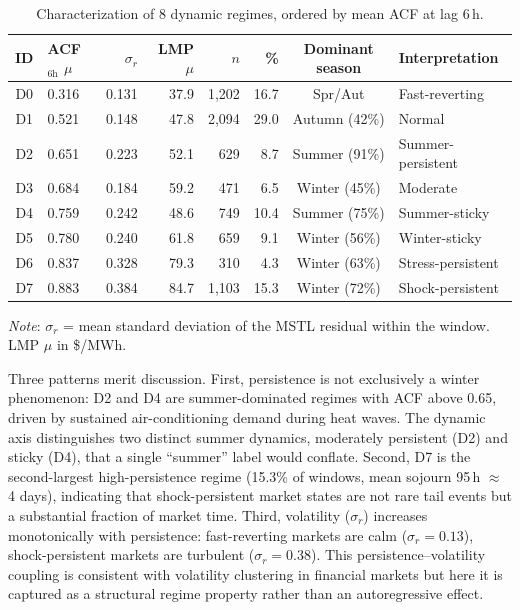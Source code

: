 \documentclass[12pt]{article}
\begin{document}
\begin{table}[H]
\centering
\caption{Characterization of 8 dynamic regimes, ordered by mean ACF at lag 6\,h.}
\label{tab:dynamic_regimes}
\small
\setlength{\tabcolsep}{4pt}
\begin{tabular}{clrrrrcl}
\toprule
ID & ACF$_\text{6h}$ $\mu$ & $\sigma_r$ & LMP $\mu$ & $n$ & \% & Dominant season & Interpretation \\
\midrule
D0 & 0.316 & 0.131 & 37.9 & 1{,}202 & 16.7 & Spr/Aut          & Fast-reverting \\
D1 & 0.521 & 0.148 & 47.8 & 2{,}094 & 29.0 & Autumn (42\%)    & Normal \\
D2 & 0.651 & 0.223 & 52.1 & 629     & 8.7  & Summer (91\%)    & Summer-persistent \\
D3 & 0.684 & 0.184 & 59.2 & 471     & 6.5  & Winter (45\%)    & Moderate \\
D4 & 0.759 & 0.242 & 48.6 & 749     & 10.4 & Summer (75\%)    & Summer-sticky \\
D5 & 0.780 & 0.240 & 61.8 & 659     & 9.1  & Winter (56\%)    & Winter-sticky \\
D6 & 0.837 & 0.328 & 79.3 & 310     & 4.3  & Winter (63\%)    & Stress-persistent \\
D7 & 0.883 & 0.384 & 84.7 & 1{,}103 & 15.3 & Winter (72\%)    & Shock-persistent \\
\bottomrule
\end{tabular}

\medskip
\small
\textit{Note}: $\sigma_r$ = mean standard deviation of the MSTL residual within the window. LMP $\mu$ in \$/MWh.
\end{table}

Three patterns merit discussion.
First, persistence is not exclusively a winter phenomenon: D2 and D4 are summer-dominated regimes with ACF above 0.65, driven by sustained air-conditioning demand during heat waves.
The dynamic axis distinguishes two distinct summer dynamics, moderately persistent (D2) and sticky (D4), that a single ``summer'' label would conflate.
Second, D7 is the second-largest high-persistence regime (15.3\% of windows, mean sojourn 95\,h $\approx$ 4 days), indicating that shock-persistent market states are not rare tail events but a substantial fraction of market time.
Third, volatility ($\sigma_r$) increases monotonically with persistence: fast-reverting markets are calm ($\sigma_r = 0.13$), shock-persistent markets are turbulent ($\sigma_r = 0.38$).
This persistence--volatility coupling is consistent with volatility clustering in financial markets but here it is captured as a structural regime property rather than an autoregressive effect.
\end{document}
